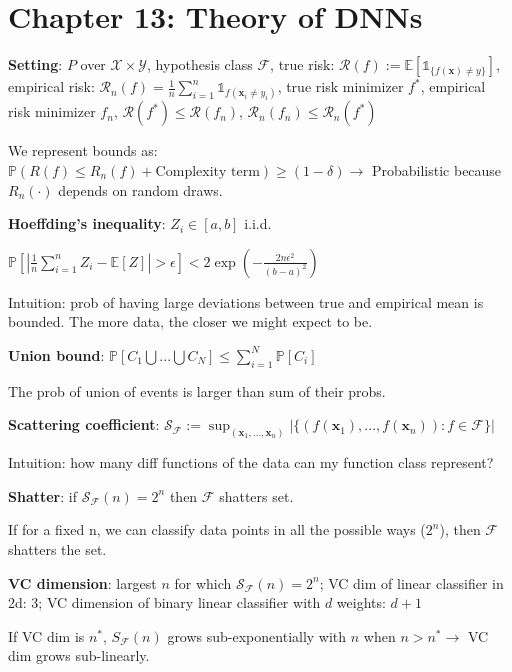 \section*{Chapter 13: Theory of DNNs}

\textbf{Setting}:
$P$ over $\mathcal X\times\mathcal Y$,
hypothesis class $\mathcal F$,
true risk: $\mathcal R(f):=\mathbb E[\mathds{1}_{\{f(\mathbf x)\neq y\}}]$,
empirical risk: $\mathcal R_n(f)=\frac 1 n \sum_{i=1}^n \mathds{1}_{f(\mathbf x_i\neq y_i)}$,
true risk minimizer $f^*$,
empirical risk minimizer $f_n$,
$\mathcal R(f^*)\leq \mathcal R(f_n)$,
$\mathcal R_n(f_n)\leq \mathcal R_n(f^*)$

We represent bounds as: $\mathbb P(R(f) \leq R_n(f) + \text{Complexity term}) \geq (1-\delta) \to$ Probabilistic because $R_n(\cdot)$ depends on random draws.

\textbf{Hoeffding's inequality}: $Z_i\in [a, b]$ i.i.d.

$\mathbb P
\left[
    \left|
        \frac 1 n \sum_{i=1}^n
            Z_i - \mathbb E[Z]
    \right|
    > \epsilon
\right]
< 2 \exp
    \left(
        -\frac
            {2n\epsilon^2}
            {(b-a)^2}
    \right)
$

Intuition: prob of having large deviations between true and empirical mean is bounded. The more data, the closer we might expect to be. 

\textbf{Union bound}:
$
\mathbb P[C_1\bigcup ... \bigcup C_N] \leq
\sum_{i=1}^N \mathbb P [C_i]
$

The prob of union of events is larger than sum of their probs.

\textbf{Scattering coefficient}:
$
\mathcal S_{\mathcal F} := \sup_{(\mathbf x_1, ..., \mathbf x_n)}
\left|
    \{
        (f(\mathbf x_1), ..., f(\mathbf x_n)) : f\in\mathcal F
    \}
\right|
$

Intuition: how many diff functions of the data can my function class represent?

\textbf{Shatter}: if $\mathcal S_{\mathcal F}(n) = 2^n$ then $\mathcal F$ shatters set.

If for a fixed n, we can classify data points in all the possible ways ($2^n$), then $\mathcal F$ shatters the set.

\textbf{VC dimension}: largest $n$ for which $\mathcal S_{\mathcal F}(n) = 2^n$;
VC dim of linear classifier in 2d: 3;
VC dimension of binary linear classifier with $d$ weights: $d+1$

If VC dim is $n^*$, $S_{\mathcal F}(n)$ grows sub-exponentially with $n$ when $n>n^*\to$ VC dim grows sub-linearly.

